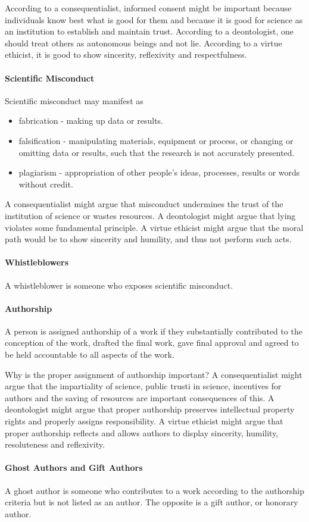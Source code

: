 According to a consequentialist, informed consent might be important because individuals know best what is good for them and because it is good for science as an institution to establish and maintain trust. According to a deontologist, one should treat others as autonomous beings and not lie. According to a virtue ethicist, it is good to show sincerity, reflexivity and respectfulness.

\paragraph{Scientific Misconduct}
Scientific misconduct may manifest as
\begin{itemize}
	\item fabrication - making up data or results.
	\item falsification - manipulating materials, equipment or process, or changing or omitting data or results, such that the research is not accurately presented.
	\item plagiarism - appropriation of other people's ideas, processes, results or words without credit.
\end{itemize}

A consequentialist might argue that misconduct undermines the trust of the institution of science or wastes resources. A deontologist might argue that lying violates some fundamental principle. A virtue ethicist might argue that the moral path would be to show sincerity and humility, and thus not perform such acts.

\paragraph{Whistleblowers}
A whistleblower is someone who exposes scientific misconduct.

\paragraph{Authorship}
A person is assigned authorship of a work if they substantially contributed to the conception of the work, drafted the final work, gave final approval and agreed to be held accountable to all aspects of the work.

Why is the proper assignment of authorship important? A consequentialist might argue that the impartiality of science, public trusti in science, incentives for authors and the saving of resources are important consequences of this. A deontologist might argue that proper authorship preserves intellectual property rights and properly assigns responsibility. A virtue ethicist might argue that proper authorship reflects and allows authors to display sincerity, humility, resoluteness and reflexivity.

\paragraph{Ghost Authors and Gift Authors}
A ghost author is someone who contributes to a work according to the authorship criteria but is not listed as an author. The opposite is a gift author, or honorary author.